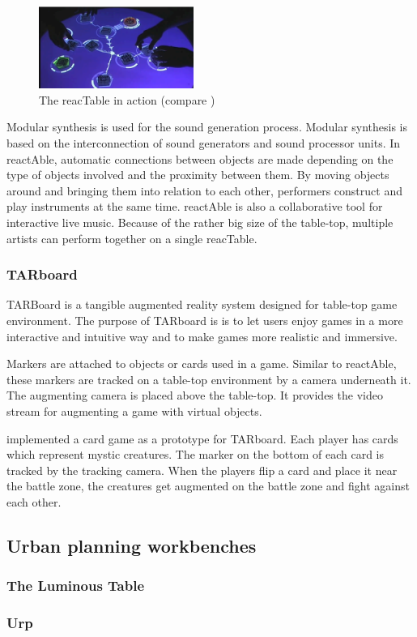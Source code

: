 \begin{figure}
\centering
\includegraphics[width=0.45\textwidth]{figures/reactable.pdf}
\caption{The reacTable in action (compare )}
\label{fig:reactable}
\end{figure}

Modular synthesis is used for the sound generation process. Modular synthesis is based on the interconnection of sound generators and sound processor units. In reactAble, automatic connections between objects are made depending on the type of objects involved and the proximity between them. By moving objects around and bringing them into relation to each other, performers construct and play instruments at the same time. reactAble is also a collaborative tool for interactive live music. Because of the rather big size of the table-top, multiple artists can perform together on a single reacTable. 

\subsubsection{TARboard}
TARBoard is a tangible augmented reality system designed for table-top game environment. The purpose of TARboard is is to let users enjoy games in a more interactive and intuitive way and to make games more realistic and immersive. 

Markers are attached to objects or cards used in a game. Similar to reactAble, these markers are tracked on a table-top environment by a camera underneath it. The augmenting camera is placed above the table-top. It provides the video stream for augmenting a game with virtual objects. 

\cite{lee05} implemented a card game as a prototype for TARboard. Each player has cards which represent mystic creatures. The marker on the bottom of each card is tracked by the tracking camera.  When the players flip a card and place it near the battle zone, the creatures get augmented on the battle zone and fight against each other.

\subsection{Urban planning workbenches}

\subsubsection{The Luminous Table}


\subsubsection{Urp}



